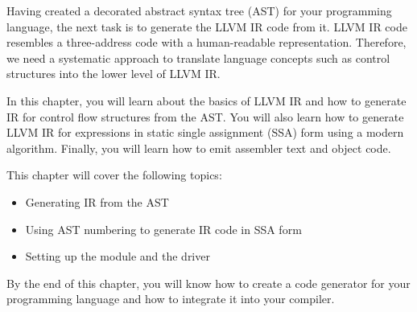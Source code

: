 
Having created a decorated abstract syntax tree (AST) for your programming language, the next
task is to generate the LLVM IR code from it. LLVM IR code resembles a three-address code with
a human-readable representation. Therefore, we need a systematic approach to translate language
concepts such as control structures into the lower level of LLVM IR.

In this chapter, you will learn about the basics of LLVM IR and how to generate IR for control flow
structures from the AST. You will also learn how to generate LLVM IR for expressions in static single assignment (SSA) form using a modern algorithm. Finally, you will learn how to emit assembler text and object code.

This chapter will cover the following topics:

\begin{itemize}
\item
Generating IR from the AST

\item
Using AST numbering to generate IR code in SSA form

\item
Setting up the module and the driver
\end{itemize}

By the end of this chapter, you will know how to create a code generator for your programming
language and how to integrate it into your compiler.

